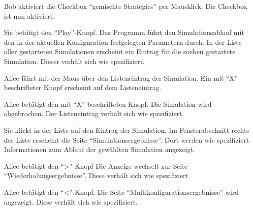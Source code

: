 \documentclass[parskip=full,11pt]{scrartcl}
\begin{document}
{Bob aktiviert die Checkbox \enquote{\glspl{gemischte Strategie}} per Mausklick.}
{Die Checkbox ist nun aktiviert.}


{Sie betätigt den \enquote{Play}-Knopf.}
{Das Programm führt den Simulationsablauf mit den in der aktuellen \Gls{Konfiguration} festgelegten Parametern durch. In der Liste aller gestarteten Simulationen erscheint ein Eintrag für die soeben gestartete Simulation. Dieser verhält sich wie spezifiziert.}

{Alice fährt mit der Maus über den Listeneintrag der Simulation.}
{Ein mit \enquote{X} beschrifteter Knopf erscheint auf dem Listeneintrag.}

{Alice betätigt den mit \enquote{X} beschrifteten Knopf.}
{Die Simulation wird abgebrochen. Der Listeneintrag verhält sich wie spezifiziert.}

{Sie klickt in der Liste auf den Eintrag der Simulation.}
{Im Fensterabschnitt rechts der Liste erscheint die Seite \enquote{Simulationsergebnisse}. Dort werden wie spezifiziert Informationen zum Ablauf der gewählten Simulation angezeigt.}

{Alice betätigt den \enquote{>}-Knopf}
{Die Anzeige wechselt zur Seite \enquote{Wiederholungsergebnisse}. Diese verhält sich wie spezifiziert}

{Alice betätigt den \enquote{<}-Knopf.}
{Die Seite \enquote{Multikonfigurationsergebnisse} wird angezeigt. Diese verhält sich wie spezifiziert.}

\end{document}
